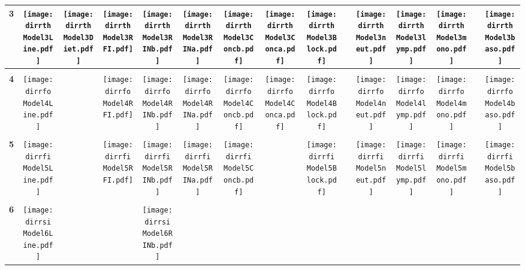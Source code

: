 \documentclass[landscape]{article}
\def \dirrth {/run/user/1000/gvfs/smb-share:server=cyfiles.iastate.edu,share=09/22/ntyet/R/RA/Data/RFI-newdata/resultsimulation/Model3.Line.Diet.RFI.Concb.RINb.Conca.RINa.neut.lymp.mono.baso.Block/}
\def \dirrfo {/run/user/1000/gvfs/smb-share:server=cyfiles.iastate.edu,share=09/22/ntyet/R/RA/Data/RFI-newdata/resultsimulation/Model4.Line.RFI.Concb.RINb.Conca.RINa.neut.lymp.mono.baso.Block/}
\def \dirrfi {/run/user/1000/gvfs/smb-share:server=cyfiles.iastate.edu,share=09/22/ntyet/R/RA/Data/RFI-newdata/resultsimulation/Model5.Line.RFI.Concb.RINb.RINa.neut.lymp.mono.baso.Block/}
\def \dirrsi{/run/user/1000/gvfs/smb-share:server=cyfiles.iastate.edu,share=09/22/ntyet/R/RA/Data/RFI-newdata/resultsimulation/Model6.Line.Concb.RINb.RINa.neut.lymp.mono.baso.Block/}
\begin{document}
\begin{table}
\begin{tabular}{ccccccccccccccc}
      {\Huge \textbf{3}} 
      &\texttt{[image: \\dirrth Model3Line.pdf]}
      &\texttt{[image: \\dirrth Model3Diet.pdf]}
      &\texttt{[image: \\dirrth Model3RFI.pdf]}
      &\texttt{[image: \\dirrth Model3RINb.pdf]}
      &\texttt{[image: \\dirrth Model3RINa.pdf]}
      &\texttt{[image: \\dirrth Model3Concb.pdf]}
      &\texttt{[image: \\dirrth Model3Conca.pdf]}
      &\texttt{[image: \\dirrth Model3Block.pdf]}
      &
      &\texttt{[image: \\dirrth Model3neut.pdf]}
      &\texttt{[image: \\dirrth Model3lymp.pdf]}
      &\texttt{[image: \\dirrth Model3mono.pdf]}
      &
      &\texttt{[image: \\dirrth Model3baso.pdf]}
     \\[3.5pt]
     \hline
     \\[3.5pt]
     {\Huge \textbf{4}} 
      &\texttt{[image: \\dirrfo Model4Line.pdf]}
      &
      &\texttt{[image: \\dirrfo Model4RFI.pdf]}
      &\texttt{[image: \\dirrfo Model4RINb.pdf]}
      &\texttt{[image: \\dirrfo Model4RINa.pdf]}
      &\texttt{[image: \\dirrfo Model4Concb.pdf]}
      &\texttt{[image: \\dirrfo Model4Conca.pdf]}
      &\texttt{[image: \\dirrfo Model4Block.pdf]}
      &
      &\texttt{[image: \\dirrfo Model4neut.pdf]}
      &\texttt{[image: \\dirrfo Model4lymp.pdf]}
      &\texttt{[image: \\dirrfo Model4mono.pdf]}
      &
      &\texttt{[image: \\dirrfo Model4baso.pdf]}
     \\[3.5pt]
     \hline
     \\[3.5pt]
     {\Huge \textbf{5}} 
      &\texttt{[image: \\dirrfi Model5Line.pdf]}
      &
      &\texttt{[image: \\dirrfi Model5RFI.pdf]}
      &\texttt{[image: \\dirrfi Model5RINb.pdf]}
      &\texttt{[image: \\dirrfi Model5RINa.pdf]}
      &\texttt{[image: \\dirrfi Model5Concb.pdf]}
      &
      &\texttt{[image: \\dirrfi Model5Block.pdf]}
      &
      &\texttt{[image: \\dirrfi Model5neut.pdf]}
      &\texttt{[image: \\dirrfi Model5lymp.pdf]}
      &\texttt{[image: \\dirrfi Model5mono.pdf]}
      &
      &\texttt{[image: \\dirrfi Model5baso.pdf]}
     \\[3.5pt]
     \hline
     \\[3.5pt]
     {\Huge \textbf{6}} 
      &\texttt{[image: \\dirrsi Model6Line.pdf]}
      &
      &
      &\texttt{[image: \\dirrsi Model6RINb.pdf]}

\end{tabular}
\end{table}
\end{document}
